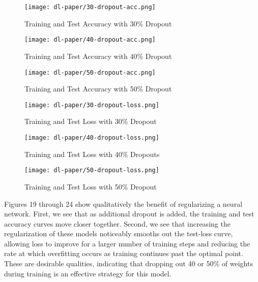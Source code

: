 \documentclass[12pt]{article}  %
\theoremstyle{definition}
\theoremstyle{remark}
\begin{document}
\begin{figure}[!h]
  \texttt{[image: dl-paper/30-dropout-acc.png]}
  \caption{Training and Test Accuracy with 30\% Dropout}\label{30-drop}
\endminipage\hfill
{}
  \texttt{[image: dl-paper/40-dropout-acc.png]}
  \caption{Training and Test Accuracy with 40\% Dropout}\label{40-drop}
\endminipage\hfill
{}%
  \texttt{[image: dl-paper/50-dropout-acc.png]}
  \caption{Training and Test Accuracy with 50\% Dropout}\label{50-drop}
\endminipage
\end{figure}


\begin{figure}[!h]
  \texttt{[image: dl-paper/30-dropout-loss.png]}
  \caption{Training and Test Loss with 30\% Dropout}\label{30-drop-loss}
\endminipage\hfill
{}
  \texttt{[image: dl-paper/40-dropout-loss.png]}
  \caption{Training and Test Loss with 40\% Dropouts}\label{40-drop-loss}
\endminipage\hfill
{}%
  \texttt{[image: dl-paper/50-dropout-loss.png]}
  \caption{Training and Test Loss with 50\% Dropout}\label{50-drop-loss}
\endminipage
\end{figure}

\par Figures 19 through 24 show qualitatively the benefit of regularizing a neural network. First, we see that as additional dropout is added, the training and test accuracy curves move closer together. Second, we see that increasing the regularization of these models noticeably smooths out the test-loss curve, allowing loss to improve for a larger number of training steps and reducing the rate at which overfitting occurs as training continues past the optimal point. These are desirable qualities, indicating that dropping out 40 or 50\% of weights during training is an effective strategy for this model. 
\end{document}
